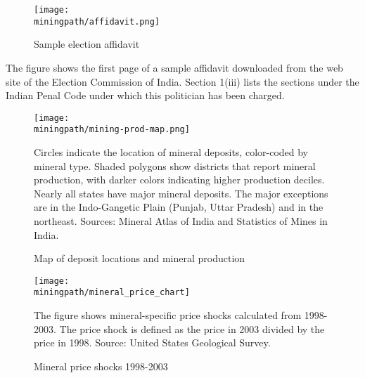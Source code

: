 \begin{figure}[H]\caption{Sample election affidavit}
  \begin{center}
    \texttt{[image: \\miningpath/affidavit.png]}
    \label{fig:affidavit}
  \end{center}
\end{figure}  
\begin{adjustwidth}{2cm}{2cm}
  \footnotesize{The figure shows the first page of a sample affidavit downloaded
    from the web site of the Election Commission of India. Section
    1(iii) lists the sections under the Indian Penal Code under which
    this politician has been charged.}
\end{adjustwidth}     


\newpage
\begin{figure}[H]\caption{Map of deposit locations and mineral production}
  \begin{center}
    \texttt{[image: \\miningpath/mining-prod-map.png]}
    \label{fig:deposit_map}
  \end{center}
  \begin{adjustwidth}{2cm}{2cm}
    \footnotesize{Circles indicate the location of mineral deposits,
      color-coded by mineral type. Shaded polygons show districts
      that report mineral production, with darker colors indicating
      higher production deciles. Nearly all states have major mineral
      deposits. The major exceptions are in the Indo-Gangetic Plain
      (Punjab, Uttar Pradesh) and in the northeast. Sources: Mineral
      Atlas of India \cite{GeologicalSurveyofIndia2001} and
      Statistics of Mines in India. }
  \end{adjustwidth}
\end{figure}

\newpage
\begin{figure}[H]\caption{Mineral price shocks 1998-2003}
  \begin{center}
    \texttt{[image: \\miningpath/mineral\_price\_chart]} 
    \label{fig:bar_pshock_2005}
  \end{center}
  \begin{adjustwidth}{2cm}{2cm}
    \footnotesize{The figure shows mineral-specific price shocks
      calculated from 1998-2003. The price shock is defined as the
      price in 2003 divided by the price in 1998. Source: United
      States Geological Survey.}
  \end{adjustwidth}
\end{figure}

